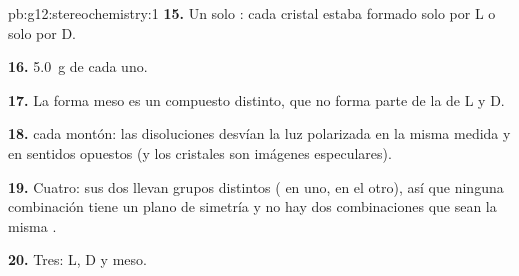 \begin{solution}{pb:g12:stereochemistry:1}
\textbf{15.} Un solo : cada cristal estaba formado solo por L
o solo por D.

\textbf{16.} \qty{5.0}{g} de cada uno.

\textbf{17.} La forma meso es un compuesto distinto, que no forma parte
de la  de L y D.

\textbf{18.}  cada montón: las disoluciones desvían la luz
polarizada en la misma medida y en sentidos opuestos (y los cristales
son imágenes especulares).

\textbf{19.} Cuatro: sus dos  llevan grupos
distintos ( en uno,  en el otro), así que ninguna
combinación tiene un plano de simetría y no hay dos combinaciones que
sean la misma .

\textbf{20.} Tres: L, D y meso.
\end{solution}
